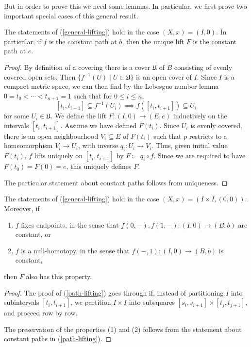 But in order to prove this we need some lemmas. In particular, we
first prove two important special cases of this general result.

\begin{lemma}
  \label{path-lifting}
  The statements of (\ref{general-lifting}) hold in the case $(X,x) =
  (I,0)$. In particular, if $f$ is the constant path at $b$, then the
  unique lift $F$ is the constant path at $e$.
\end{lemma}

\renewcommand{\U}{\mathfrak{U}}

\begin{proof}
  By definition of a covering there is a cover $\U$ of $B$ consisting
  of evenly covered open sets. Then $\{f^{-1}(U) \mid U \in \U\}$ is
  an open cover of $I$. Since $I$ is a compact metric space, we can
  then find by the Lebesgue number lemma $0 = t_0 < \cdots < t_{n+1} =
  1$ such that for $0 \le i \le n$,
  \[
  [t_i,t_{i+1}] \subseteq f^{-1}(U_i) \implies f([t_i,t_{i+1}])
  \subseteq U_i
  \]
  for some $U_i \in \U$. We define the lift $F : (I,0) \to (E,e)$
  inductively on the intervals $[t_i,t_{i+1}]$. Assume we have defined
  $F(t_i)$. Since $U_i$ is evenly covered, there is an open
  neighbourhood $V_i \subseteq E$ of $F(t_i)$ such that $p$ restricts
  to a homeomorphism $V_i \to U_i$, with inverse $q_i : U_i \to
  V_i$. Thus, given initial value $F(t_i)$, $f$ lifts uniquely on
  $[t_i,t_{i+1}]$ by $F \coloneqq q_i \circ f$. Since we are required
  to have $F(t_0) = F(0) = e$, this uniquely defines $F$.

  The particular statement about constant paths follows from
  uniqueness.
\end{proof}

\begin{lemma}
  \label{homotopy-lifting}
  The statements of (\ref{general-lifting}) hold in the case $(X,x) =
  (I \times I, (0,0))$. Moreover, if
  \begin{enumerate}
  \item $f$ fixes endpoints, in the sense that $f(0,-), f(1,-) : (I,0)
    \to (B,b)$ are constant, or
  \item $f$ is a null-homotopy, in the sense that $f(-,1) : (I,0) \to
    (B,b)$ is constant,
  \end{enumerate}
  then $F$ also has this property.
\end{lemma}

\begin{proof}
  The proof of (\ref{path-lifting}) goes through if, instead of
  partitioning $I$ into subintervals $[t_i,t_{i+1}]$, we partition $I
  \times I$ into subsquares $[s_i,s_{i+1}] \times [t_j,t_{j+1}]$, and
  proceed row by row.

  The preservation of the properties (1) and (2) follows from the
  statement about constant paths in (\ref{path-lifting}).
\end{proof}

